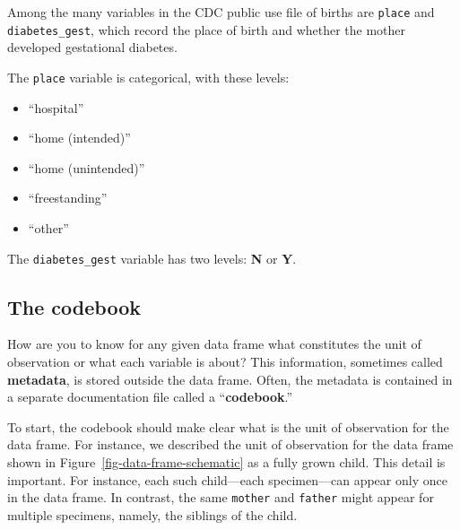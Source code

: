 \documentclass[
  letterpaper,
  DIV=11,
  numbers=noendperiod,
  oneside]{scrartcl}
\providecommand{\tightlist}{%
  \setlength{\itemsep}{0pt}\setlength{\parskip}{0pt}}\usepackage{longtable,booktabs,array}
\begin{document}
{}

\begin{tcolorbox}[enhanced jigsaw, colbacktitle=quarto-callout-note-color!10!white, opacityback=0, breakable, opacitybacktitle=0.6, colback=white, coltitle=black, arc=.35mm, title=\textcolor{quarto-callout-note-color}{\faInfo}\hspace{0.5em}{Example (cont.): The CDC births data frame}, left=2mm, colframe=quarto-callout-note-color-frame, rightrule=.15mm, bottomrule=.15mm, leftrule=.75mm, bottomtitle=1mm, toptitle=1mm, titlerule=0mm, toprule=.15mm]

Among the many variables in the CDC public use file of births are
\texttt{place} and \texttt{diabetes\_gest}, which record the place of
birth and whether the mother developed gestational diabetes.

The \texttt{place} variable is categorical, with these levels:

\begin{itemize}
\tightlist
\item
  ``hospital''
\item
  ``home (intended)''
\item
  ``home (unintended)''
\item
  ``freestanding''
\item
  ``other''
\end{itemize}

The \texttt{diabetes\_gest} variable has two levels: \textbf{N} or
\textbf{Y}.

\end{tcolorbox}

\subsection{The codebook}\label{sec-codebook}

How are you to know for any given data frame what constitutes the unit
of observation or what each variable is about? This information,
sometimes called \textbf{metadata}, is stored outside the data frame.
Often, the metadata is contained in a separate documentation file called
a ``\textbf{codebook}.''

To start, the codebook should make clear what is the unit of observation
for the data frame. For instance, we described the unit of observation
for the data frame shown in Figure~\ref{fig-data-frame-schematic} as a
fully grown child. This detail is important. For instance, each such
child---each specimen---can appear only once in the data frame. In
contrast, the same \texttt{mother} and \texttt{father} might appear for
multiple specimens, namely, the siblings of the child.
\end{document}
